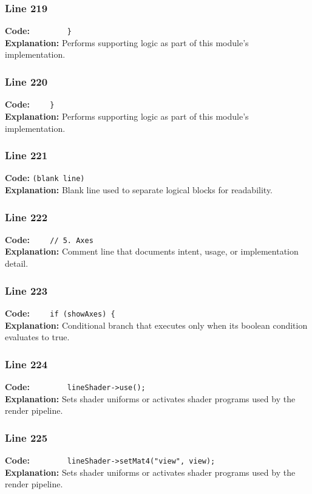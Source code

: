 \documentclass[11pt,a4paper]{article}
\begin{document}
\subsubsection*{Line 219}
\textbf{Code:} \verb|        }|\\
\textbf{Explanation:} Performs supporting logic as part of this module's implementation.

\subsubsection*{Line 220}
\textbf{Code:} \verb|    }|\\
\textbf{Explanation:} Performs supporting logic as part of this module's implementation.

\subsubsection*{Line 221}
\textbf{Code:} \texttt{(blank line)}\\
\textbf{Explanation:} Blank line used to separate logical blocks for readability.

\subsubsection*{Line 222}
\textbf{Code:} \verb|    // 5. Axes|\\
\textbf{Explanation:} Comment line that documents intent, usage, or implementation detail.

\subsubsection*{Line 223}
\textbf{Code:} \verb|    if (showAxes) {|\\
\textbf{Explanation:} Conditional branch that executes only when its boolean condition evaluates to true.

\subsubsection*{Line 224}
\textbf{Code:} \verb|        lineShader->use();|\\
\textbf{Explanation:} Sets shader uniforms or activates shader programs used by the render pipeline.

\subsubsection*{Line 225}
\textbf{Code:} \verb|        lineShader->setMat4("view", view);|\\
\textbf{Explanation:} Sets shader uniforms or activates shader programs used by the render pipeline.
\end{document}
